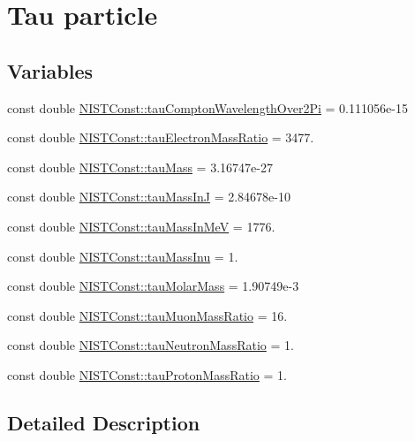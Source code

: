 \hypertarget{group___tau}{}\section{Tau particle}
\label{group___tau}
\subsection*{Variables}
\begin{DoxyCompactItemize}
\item 
const double \hyperlink{group___tau_ga3cca663c9ba88e04346cbd29643aba14}{N\+I\+S\+T\+Const\+::tau\+Compton\+Wavelength\+Over2\+Pi} = 0.\+111056e-\/15
\item 
const double \hyperlink{group___tau_ga58efae35c13c681c03e115a97659063a}{N\+I\+S\+T\+Const\+::tau\+Electron\+Mass\+Ratio} = 3477.
\item 
const double \hyperlink{group___tau_gabb1b68dd381ed2582050fd991f210be8}{N\+I\+S\+T\+Const\+::tau\+Mass} = 3.\+16747e-\/27
\item 
const double \hyperlink{group___tau_ga16b85e377d419016e21dc80e464d811c}{N\+I\+S\+T\+Const\+::tau\+Mass\+InJ} = 2.\+84678e-\/10
\item 
const double \hyperlink{group___tau_ga9959b7d66d60226941c2d2658606a4e2}{N\+I\+S\+T\+Const\+::tau\+Mass\+In\+MeV} = 1776.
\item 
const double \hyperlink{group___tau_gaa0a5019135251853d2761cb9af892aea}{N\+I\+S\+T\+Const\+::tau\+Mass\+Inu} = 1.
\item 
const double \hyperlink{group___tau_ga07e317845454c4534cc0273efa2e55c6}{N\+I\+S\+T\+Const\+::tau\+Molar\+Mass} = 1.\+90749e-\/3
\item 
const double \hyperlink{group___tau_gac648100c94ae427f98a87390a9263379}{N\+I\+S\+T\+Const\+::tau\+Muon\+Mass\+Ratio} = 16.
\item 
const double \hyperlink{group___tau_ga024557c365e76b225bef98f0a0a9283b}{N\+I\+S\+T\+Const\+::tau\+Neutron\+Mass\+Ratio} = 1.
\item 
const double \hyperlink{group___tau_ga07236b2b11bdbfaee49e581a44bb01e8}{N\+I\+S\+T\+Const\+::tau\+Proton\+Mass\+Ratio} = 1.
\end{DoxyCompactItemize}


\subsection{Detailed Description}


